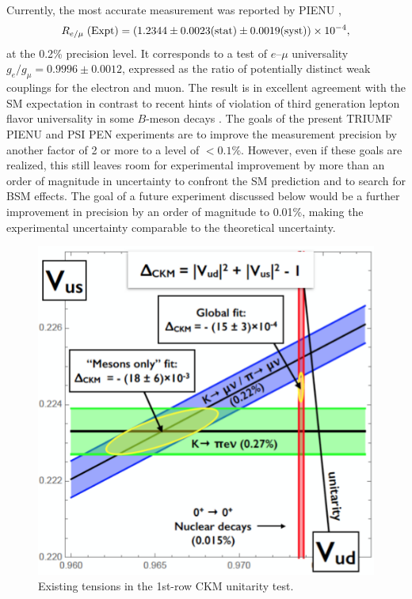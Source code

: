 \paragraph{}
Currently, the most accurate measurement was reported by PIENU \cite{Aguilar-Arevalo3},
\begin{equation}
\label{Remu_exp}
     R_{e/\mu} \hspace{0.1cm} \text{(Expt)} = (1.2344 \pm 0.0023 (\text{stat}) \pm 0.0019 (\text{syst})) \times 10^{-4},
\end{equation}
 at the 0.2\%  precision level. It corresponds to a test of $e$--$\mu$ universality $g_e/g_\mu = 0.9996 \pm 0.0012$, expressed as the ratio of potentially distinct weak couplings for the electron and muon. The result is in excellent agreement with the SM expectation in contrast to recent hints of violation of third generation lepton flavor universality in some $B$-meson decays \cite{LFVB}. The goals of the present TRIUMF PIENU \cite{Aguilar-Arevalo4, Aguilar-Arevalo5} and PSI PEN \cite{Pocanic1, Pocanic2, Pocanic3} experiments are to improve the measurement precision by another factor of 2 or more to a level of $<0.1\%$. However, even if these goals are realized, this still leaves room for experimental improvement by more than an order of magnitude in uncertainty to confront
the SM prediction and to search for BSM effects. The goal of a future experiment discussed below would be a further improvement in precision by an order of magnitude to 0.01\%, making the
experimental uncertainty comparable to the theoretical uncertainty.



\begin{figure}[t!]
\centering
\includegraphics[scale=0.5]{sections/figures/fig-ckm.png}
\caption{Existing tensions in the 1st-row CKM unitarity test.}
\label{fig:CKM}
\end{figure}


